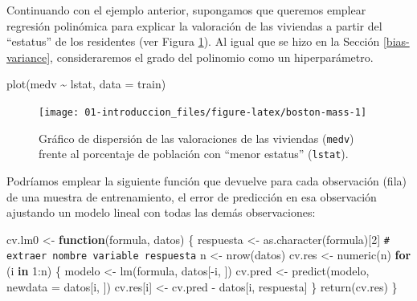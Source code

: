 \documentclass[
]{book}
\newenvironment{Shaded}{\begin{snugshade}}{\end{snugshade}}
\newcommand{\AttributeTok}[1]{\textcolor[rgb]{0.77,0.63,0.00}{#1}}
\newcommand{\CommentTok}[1]{\textcolor[rgb]{0.56,0.35,0.01}{\textit{#1}}}
\newcommand{\ControlFlowTok}[1]{\textcolor[rgb]{0.13,0.29,0.53}{\textbf{#1}}}
\newcommand{\DecValTok}[1]{\textcolor[rgb]{0.00,0.00,0.81}{#1}}
\newcommand{\FunctionTok}[1]{\textcolor[rgb]{0.00,0.00,0.00}{#1}}
\newcommand{\NormalTok}[1]{#1}
\newcommand{\OtherTok}[1]{\textcolor[rgb]{0.56,0.35,0.01}{#1}}
\newcommand{\SpecialCharTok}[1]{\textcolor[rgb]{0.00,0.00,0.00}{#1}}
\theoremstyle{break}
\theoremstyle{nonumberplain}
\renewcommand{\CommentTok}[1]{\textcolor[rgb]{0.41,0.41,0.41}{\texttt{#1}}}
\begin{document}
Continuando con el ejemplo anterior, supongamos que queremos emplear regresión polinómica para explicar la valoración de las viviendas a partir del ``estatus'' de los residentes (ver Figura \ref{fig:boston-mass}).
Al igual que se hizo en la Sección \ref{bias-variance}, consideraremos el grado del polinomio como un hiperparámetro.



\begin{Shaded}
\begin{Highlighting}[]
\FunctionTok{plot}\NormalTok{(medv }\SpecialCharTok{\textasciitilde{}}\NormalTok{ lstat, }\AttributeTok{data =}\NormalTok{ train)}
\end{Highlighting}
\end{Shaded}

\begin{figure}[!htb]

{\centering \texttt{[image: 01-introduccion\_files/figure-latex/boston-mass-1]} 

}

\caption{Gráfico de dispersión de las valoraciones de las viviendas (\texttt{medv}) frente al porcentaje de población con ``menor estatus'' (\texttt{lstat}).}\label{fig:boston-mass}
\end{figure}

Podríamos emplear la siguiente función que devuelve para cada observación (fila) de una muestra de entrenamiento, el error de predicción en esa observación ajustando un modelo lineal con todas las demás observaciones:

\begin{Shaded}
\begin{Highlighting}[]
\NormalTok{cv.lm0 }\OtherTok{\textless{}{-}} \ControlFlowTok{function}\NormalTok{(formula, datos) \{}
\NormalTok{    respuesta }\OtherTok{\textless{}{-}} \FunctionTok{as.character}\NormalTok{(formula)[}\DecValTok{2}\NormalTok{] }\CommentTok{\# extraer nombre variable respuesta}
\NormalTok{    n }\OtherTok{\textless{}{-}} \FunctionTok{nrow}\NormalTok{(datos)}
\NormalTok{    cv.res }\OtherTok{\textless{}{-}} \FunctionTok{numeric}\NormalTok{(n)}
    \ControlFlowTok{for}\NormalTok{ (i }\ControlFlowTok{in} \DecValTok{1}\SpecialCharTok{:}\NormalTok{n) \{}
\NormalTok{        modelo }\OtherTok{\textless{}{-}} \FunctionTok{lm}\NormalTok{(formula, datos[}\SpecialCharTok{{-}}\NormalTok{i, ])}
\NormalTok{        cv.pred }\OtherTok{\textless{}{-}} \FunctionTok{predict}\NormalTok{(modelo, }\AttributeTok{newdata =}\NormalTok{ datos[i, ])}
\NormalTok{        cv.res[i] }\OtherTok{\textless{}{-}}\NormalTok{ cv.pred }\SpecialCharTok{{-}}\NormalTok{ datos[i, respuesta]}
\NormalTok{    \}}
    \FunctionTok{return}\NormalTok{(cv.res)}
\NormalTok{\}}
\end{Highlighting}
\end{Shaded}
\end{document}
